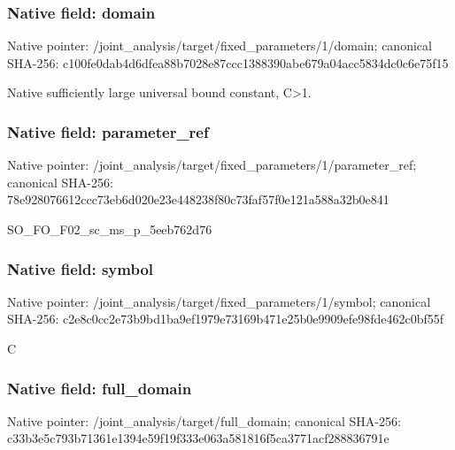 \documentclass[10pt,a4paper]{article}
\begin{document}
\subsubsection{Native field: domain}
Native pointer: /joint\_\allowbreak{}analysis/target/fixed\_\allowbreak{}parameters/1/domain; canonical SHA-256: c100fe0dab4d6dfea88b7028e87ccc1388390abe679a04acc5834dc0c6e75f15

\begingroup\raggedright\sloppy Native sufficiently large universal bound constant,\allowbreak{} C>1.\par\endgroup

\subsubsection{Native field: parameter\_\allowbreak{}ref}
Native pointer: /joint\_\allowbreak{}analysis/target/fixed\_\allowbreak{}parameters/1/parameter\_\allowbreak{}ref; canonical SHA-256: 78e928076612ccc73eb6d020e23e448238f80c73faf57f0e121a588a32b0e841

\begingroup\raggedright\sloppy SO\_\allowbreak{}FO\_\allowbreak{}F02\_\allowbreak{}sc\_\allowbreak{}ms\_\allowbreak{}p\_\allowbreak{}5eeb762d76\par\endgroup

\subsubsection{Native field: symbol}
Native pointer: /joint\_\allowbreak{}analysis/target/fixed\_\allowbreak{}parameters/1/symbol; canonical SHA-256: c2e8c0cc2e73b9bd1ba9ef1979e73169b471e25b0e9909efe98fde462c0bf55f

\begingroup\raggedright\sloppy C\par\endgroup

\subsubsection{Native field: full\_\allowbreak{}domain}
Native pointer: /joint\_\allowbreak{}analysis/target/full\_\allowbreak{}domain; canonical SHA-256: c33b3e5c793b71361e1394e59f19f333e063a581816f5ca3771acf288836791e
\end{document}
